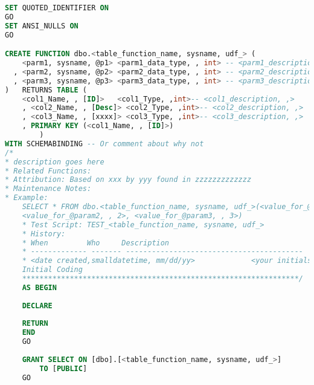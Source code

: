 \begin{lstlisting}[language = SQL, caption = Multistatement UDF template, label={lst:multistatementudf}]
SET QUOTED_IDENTIFIER ON
GO
SET ANSI_NULLS ON
GO

CREATE FUNCTION dbo.<table_function_name, sysname, udf_> (
    <parm1, sysname, @p1> <parm1_data_type, , int> -- <parm1_description, ,>
  , <parm2, sysname, @p2> <parm2_data_type, , int> -- <parm2_description, ,>
  , <parm3, sysname, @p3> <parm3_data_type, , int> -- <parm3_description, ,> 
)   RETURNS TABLE (
    <col1_Name, , [ID]>   <col1_Type, ,int>-- <col1_description, ,>
    , <col2_Name, , [Desc]> <col2_Type, ,int>-- <col2_description, ,>
    , <col3_Name, , [xxxx]> <col3_Type, ,int>-- <col3_description, ,>
    , PRIMARY KEY (<col1_Name, , [ID]>)
        )
WITH SCHEMABINDING -- Or comment about why not
/*
* description goes here
* Related Functions:
* Attribution: Based on xxx by yyy found in zzzzzzzzzzzzz
* Maintenance Notes:
* Example:
    SELECT * FROM dbo.<table_function_name, sysname, udf_>(<value_for_@param1, , 1>,
    <value_for_@param2, , 2>, <value_for_@param3, , 3>)
    * Test Script: TEST_<table_function_name, sysname, udf_>
    * History:
    * When         Who     Description
    * ------------- ------- -----------------------------------------
    * <date created,smalldatetime, mm/dd/yy>             <your initials,char(8), XXX>
    Initial Coding
    ****************************************************************/
    AS BEGIN
    
    DECLARE
    
    RETURN
    END
    GO
    
    GRANT SELECT ON [dbo].[<table_function_name, sysname, udf_>]
        TO [PUBLIC]
    GO
\end{lstlisting}
